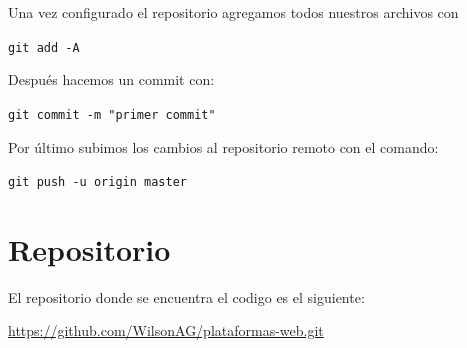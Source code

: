 \documentclass[12pt]{article}
\begin{document}
Una vez configurado el repositorio agregamos todos nuestros archivos con

\lstinline{git add -A}

Después hacemos un commit con:

\lstinline{git commit -m "primer commit"}

Por último subimos los cambios al repositorio remoto con el comando:

\lstinline{git push -u origin master}

\section{Repositorio}

El repositorio donde se encuentra el codigo es el siguiente:

\url{https://github.com/WilsonAG/plataformas-web.git}
\end{document}
